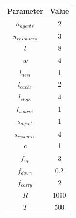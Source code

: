 \documentclass[12pt]{article}  %
\begin{document}
\begin{center}
\begin{tabular}{ |c|c| } 
 \hline
 Parameter & Value  \\ 
 \hline
 \hline
 $n_{agents}$ & 2  \\ 
 \hline
 $n_{resources}$ & 3  \\ 
 \hline
 $l$ & 8  \\ 
 \hline
 $w$ & 4  \\ 
 \hline
 $l_{nest}$ & 1  \\ 
 \hline
 $l_{cache}$ & 2  \\ 
 \hline
 $l_{slope}$ & 4  \\ 
 \hline
 $l_{source}$ & 1  \\ 
 \hline
 $s_{agent}$ & 1  \\ 
 \hline
 $s_{resource}$ & 4  \\ 
 \hline
 $c$ & 1  \\ 
 \hline
 $f_{up}$ & 3  \\ 
 \hline
 $f_{down}$ & 0.2  \\ 
 \hline
 $f_{carry}$ & 2  \\ 
 \hline
 $R$ & 1000  \\ 
 \hline
 $T$ & 500  \\ 
 \hline
 
\end{tabular}
\end{center}
\end{document}
